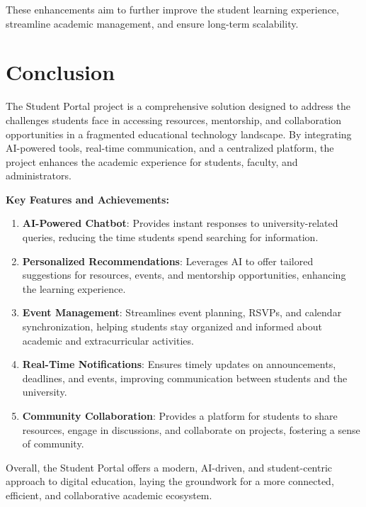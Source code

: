 These enhancements aim to further improve the student learning experience, streamline academic management, and ensure long-term scalability.

\section{Conclusion}

The Student Portal project is a comprehensive solution designed to address the challenges students face in accessing resources, mentorship, and collaboration opportunities in a fragmented educational technology landscape. By integrating AI-powered tools, real-time communication, and a centralized platform, the project enhances the academic experience for students, faculty, and administrators.

\textbf{Key Features and Achievements:}
\begin{enumerate}
  \item \textbf{AI-Powered Chatbot}: Provides instant responses to university-related queries, reducing the time students spend searching for information.

  \item \textbf{Personalized Recommendations}: Leverages AI to offer tailored suggestions for resources, events, and mentorship opportunities, enhancing the learning experience.

  \item \textbf{Event Management}: Streamlines event planning, RSVPs, and calendar synchronization, helping students stay organized and informed about academic and extracurricular activities.

  \item \textbf{Real-Time Notifications}: Ensures timely updates on announcements, deadlines, and events, improving communication between students and the university.

  \item \textbf{Community Collaboration}: Provides a platform for students to share resources, engage in discussions, and collaborate on projects, fostering a sense of community.
\end{enumerate}

Overall, the Student Portal offers a modern, AI-driven, and student-centric approach to digital education, laying the groundwork for a more connected, efficient, and collaborative academic ecosystem.

\vspace{10cm}


